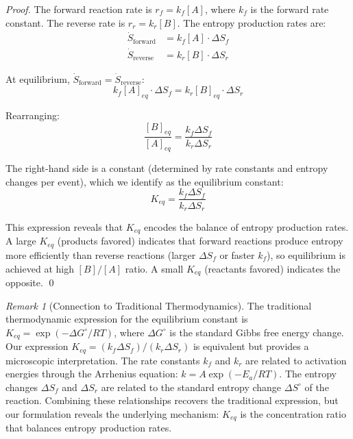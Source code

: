 \documentclass[12pt,a4paper]{article}
\theoremstyle{definition}
\theoremstyle{remark}
\newtheorem{remark}[theorem]{Remark}
\begin{document}
\begin{proof}
The forward reaction rate is $r_f = k_f [A]$, where $k_f$ is the forward rate constant. The reverse rate is $r_r = k_r [B]$. The entropy production rates are:
\begin{align}
\dot{S}_{\text{forward}} &= k_f [A] \cdot \Delta S_f \\
\dot{S}_{\text{reverse}} &= k_r [B] \cdot \Delta S_r
\end{align}

At equilibrium, $\dot{S}_{\text{forward}} = \dot{S}_{\text{reverse}}$:
\begin{equation}
k_f [A]_{eq} \cdot \Delta S_f = k_r [B]_{eq} \cdot \Delta S_r
\end{equation}

Rearranging:
\begin{equation}
\frac{[B]_{eq}}{[A]_{eq}} = \frac{k_f \Delta S_f}{k_r \Delta S_r}
\end{equation}

The right-hand side is a constant (determined by rate constants and entropy changes per event), which we identify as the equilibrium constant:
\begin{equation}
K_{eq} = \frac{k_f \Delta S_f}{k_r \Delta S_r}
\end{equation}

This expression reveals that $K_{eq}$ encodes the balance of entropy production rates. A large $K_{eq}$ (products favored) indicates that forward reactions produce entropy more efficiently than reverse reactions (larger $\Delta S_f$ or faster $k_f$), so equilibrium is achieved at high $[B]/[A]$ ratio. A small $K_{eq}$ (reactants favored) indicates the opposite. \qed
\end{proof}

\begin{remark}[Connection to Traditional Thermodynamics]
\label{rem:keq_traditional}
The traditional thermodynamic expression for the equilibrium constant is $K_{eq} = \exp(-\Delta G^\circ / RT)$, where $\Delta G^\circ$ is the standard Gibbs free energy change. Our expression $K_{eq} = (k_f \Delta S_f) / (k_r \Delta S_r)$ is equivalent but provides a microscopic interpretation. The rate constants $k_f$ and $k_r$ are related to activation energies through the Arrhenius equation: $k = A \exp(-E_a / RT)$. The entropy changes $\Delta S_f$ and $\Delta S_r$ are related to the standard entropy change $\Delta S^\circ$ of the reaction. Combining these relationships recovers the traditional expression, but our formulation reveals the underlying mechanism: $K_{eq}$ is the concentration ratio that balances entropy production rates.
\end{remark}
\end{document}
